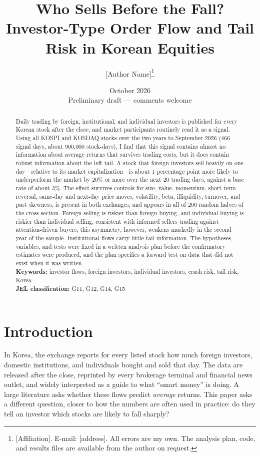 \documentclass[11pt]{article}
\title{\textbf{Who Sells Before the Fall?\\Investor-Type Order Flow and Tail Risk in Korean Equities}}
\author{[Author Name]\thanks{[Affiliation]. E-mail: [address]. All errors are my own. The analysis plan, code, and
results files are available from the author on request.}}
\date{October 2026\\[4pt]\small Preliminary draft --- comments welcome}
\begin{document}
\maketitle

\begin{abstract}
\noindent
Daily trading by foreign, institutional, and individual investors is published for every Korean stock after the
close, and market participants routinely read it as a signal. Using all KOSPI and KOSDAQ stocks over the two years to
September 2026 (466 signal days, about 900,000 stock-days), I find that this signal contains almost no information
about average returns that survives trading costs, but it does contain robust information about the left tail. A
stock that foreign investors sell heavily on one day---relative to its market capitalization---is about 1 percentage
point more likely to underperform the market by 20\% or more over the next 20 trading days, against a base rate of
about 3\%. The effect survives controls for size, value, momentum, short-term reversal, same-day and next-day price
moves, volatility, beta, illiquidity, turnover, and past skewness, is present in both exchanges, and appears in all of
200 random halves of the cross-section. Foreign selling is riskier than foreign buying, and individual buying is
riskier than individual selling, consistent with informed sellers trading against attention-driven buyers; this
asymmetry, however, weakens markedly in the second year of the sample. Institutional flows carry little tail
information. The hypotheses, variables, and tests were fixed in a written analysis plan before the confirmatory
estimates were produced, and the plan specifies a forward test on data that did not exist when it was written.
\\[6pt]
\textbf{Keywords:} investor flows, foreign investors, individual investors, crash risk, tail risk, Korea\\
\textbf{JEL classification:} G11, G12, G14, G15
\end{abstract}

\newpage
\section{Introduction}\label{sec:intro}

In Korea, the exchange reports for every listed stock how much foreign investors, domestic institutions, and
individuals bought and sold that day. The data are released after the close, reprinted by every brokerage terminal and
financial news outlet, and widely interpreted as a guide to what ``smart money'' is doing. A large literature asks
whether these flows predict \emph{average} returns. This paper asks a different question, closer to how the numbers are
often used in practice: do they tell an investor which stocks are likely to fall sharply?
\end{document}
